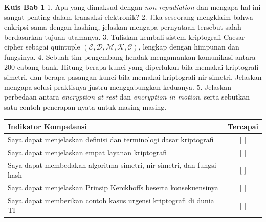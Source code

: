 

\begin{obeassessment}
\textbf{Kuis Bab 1}
1. Apa yang dimaksud dengan \textit{non-repudiation} dan mengapa hal ini sangat penting dalam transaksi elektronik?
2. Jika seseorang mengklaim bahwa enkripsi sama dengan hashing, jelaskan mengapa pernyataan tersebut salah berdasarkan tujuan utamanya.
3. Tuliskan kembali sistem kriptografi Caesar cipher sebagai quintuple
   $(\mathcal{E},\mathcal{D},\mathcal{M},\mathcal{K},\mathcal{C})$, lengkap dengan
   himpunan dan fungsinya.
4. Sebuah tim pengembang hendak mengamankan komunikasi antara 200 cabang bank.
   Hitung berapa kunci yang diperlukan bila memakai kriptografi simetri, dan berapa
   pasangan kunci bila memakai kriptografi nir-simetri. Jelaskan mengapa solusi
   praktisnya justru menggabungkan keduanya.
5. Jelaskan perbedaan antara \textit{encryption at rest} dan \textit{encryption in
   motion}, serta sebutkan satu contoh penerapan nyata untuk masing-masing.
\end{obeassessment}
\begin{competencychecklist}
\begin{tabularx}{\linewidth}{|X|c|}
\hline
Indikator Kompetensi & Tercapai \\
\hline
Saya dapat menjelaskan definisi dan terminologi dasar kriptografi & [ ] \\
\hline
Saya dapat menjelaskan empat layanan kriptografi & [ ] \\
\hline
Saya dapat membedakan algoritma simetri, nir-simetri, dan fungsi hash & [ ] \\
\hline
Saya dapat menjelaskan Prinsip Kerckhoffs beserta konsekuensinya & [ ] \\
\hline
Saya dapat memberikan contoh kasus urgensi kriptografi di dunia TI & [ ] \\
\hline
\end{tabularx}
\end{competencychecklist}

